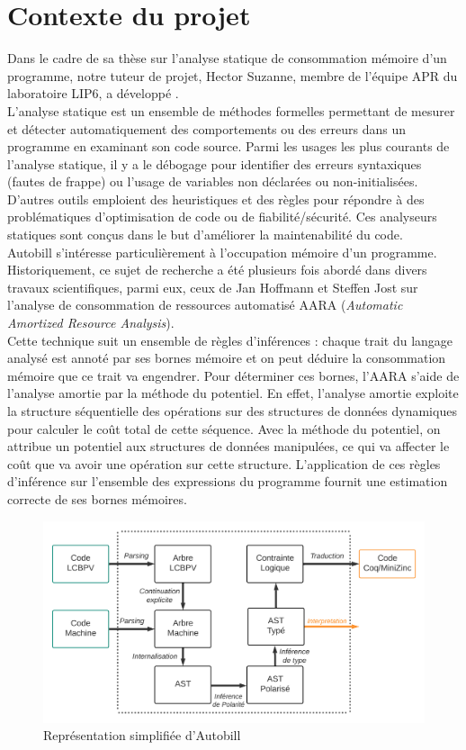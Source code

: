 \documentclass[12pt]{article}
\begin{document}
{
      \hypersetup{linkcolor=}
      \setcounter{tocdepth}{3}
      \tableofcontents
}
\newpage

\section{Contexte du projet}\label{contexte-du-projet}
Dans le cadre de sa thèse sur l'analyse statique de consommation
mémoire d'un programme, notre tuteur de projet, Hector Suzanne, membre de l'équipe APR du laboratoire LIP6, a développé \cite{autobill}. \\
L'analyse statique est un ensemble de méthodes formelles permettant de
mesurer et détecter automatiquement des comportements ou des erreurs dans un
programme en examinant son code source. Parmi les usages les plus courants
de l'analyse statique, il y a le débogage pour identifier des erreurs
syntaxiques (fautes de frappe) ou l'usage de variables non déclarées ou
non-initialisées. D'autres outils emploient des heuristiques et des règles pour répondre à des problématiques d'optimisation de code ou de fiabilité/sécurité. Ces analyseurs statiques sont conçus dans le but d'améliorer la maintenabilité du code. \\
Autobill s'intéresse particulièrement à l'occupation mémoire d'un programme. Historiquement,
ce sujet de recherche a été plusieurs fois abordé dans divers travaux scientifiques, parmi eux, ceux de Jan Hoffmann et Steffen Jost sur l'analyse de consommation de ressources automatisé AARA
\cite{Hoffmann} (\emph{Automatic Amortized
      Resource Analysis}).\\
Cette technique suit un ensemble de règles d'inférences : chaque trait du langage analysé est annoté par ses bornes mémoire et on peut déduire la consommation mémoire que ce trait va engendrer. Pour déterminer ces bornes, l'AARA s'aide de l'analyse amortie par la méthode du potentiel. En effet, l'analyse amortie exploite la structure séquentielle des opérations sur des structures de données dynamiques pour calculer le coût total de cette séquence. Avec la méthode du potentiel, on attribue un potentiel aux structures de données manipulées, ce qui va affecter le coût que va avoir une opération sur cette structure. L’application de ces règles d'inférence sur l'ensemble des expressions du programme fournit une estimation correcte de ses bornes mémoires.
\begin{figure}[!b]
      \centering
      \includegraphics[scale=0.55]{Figures/Schema_Autobill.png}
      \caption{Représentation simplifiée d'Autobill\label{fig1}}
\end{figure}
\end{document}
